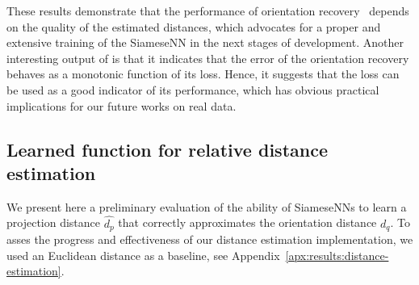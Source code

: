 These results demonstrate that the performance of orientation recovery~ depends on the quality of the estimated distances, which advocates for a proper and extensive training of the SiameseNN in the next stages of development.
Another interesting output of  is that it indicates that the error of the orientation recovery behaves as a monotonic function of its loss.
Hence, it suggests that the loss can be used as a good indicator of its performance, which has obvious practical implications for our future works on real data.


\subsection{Learned function for relative distance estimation }\label{sec:results:distance-estimation:learned}


We present here a preliminary evaluation of the ability of SiameseNNs to learn a projection distance $\widehat{d_p}$ that correctly approximates the orientation distance $d_q$. To asses the progress and effectiveness of our distance estimation implementation, we used an Euclidean distance as a baseline, see Appendix~\ref{apx:results:distance-estimation}.


